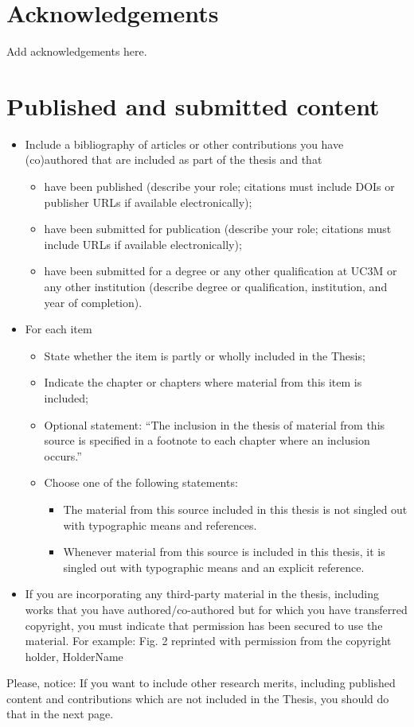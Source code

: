 \documentclass[12pt]{report} %
\begin{document}
\chapter*{Acknowledgements}
\thispagestyle{empty}
Add acknowledgements here. 

\chapter*{Published and submitted content}
\thispagestyle{empty}
\begin{itemize}
    \item Include a bibliography of articles or other contributions you have (co)authored that are included as part of the thesis and that
    \begin{itemize}
        \item have been published (describe your role; citations must include DOIs or publisher URLs if available electronically);  
        \item have been submitted for publication (describe your role; citations must include URLs if available electronically);
        \item have been submitted for a degree or any other qualification at UC3M or any other institution (describe degree or qualification, institution, and year of completion).
    \end{itemize}
    \item For each item 
    \begin{itemize}
        \item State whether the item is partly or wholly included in the Thesis;
        \item Indicate the chapter or chapters where material from this item is included;
        \item Optional statement: “The inclusion in the thesis of material from this source is specified in a footnote to each chapter where an inclusion occurs.”
        \item Choose one of the following statements:
        \begin{itemize}
            \item The material from this source included in this thesis is not singled out with typographic means and references.
            \item Whenever material from this source is included in this thesis, it is singled out with typographic means and an explicit reference.
        \end{itemize}
        \end{itemize}
    \item If you are incorporating any third-party material in the thesis, including works that you have authored/co-authored but for which you have transferred copyright, you must indicate that permission has been secured to use the material. For example: Fig.  2 reprinted with permission from the copyright holder, HolderName
\end{itemize}
Please, notice:  If you want to include other research merits, including published content and contributions which are not included in the Thesis, you should do that in the next page.
\end{document}
